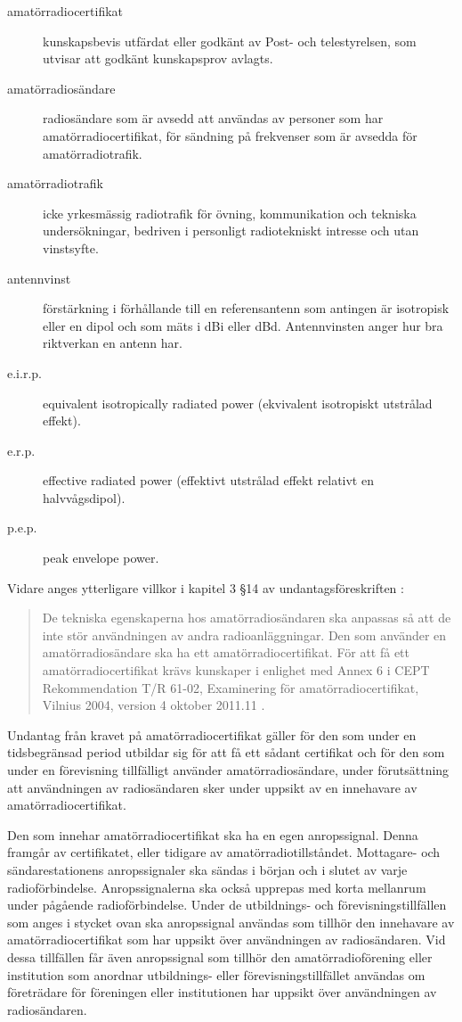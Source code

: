 \begin{description}
\item[amatörradiocertifikat] kunskapsbevis utfärdat eller godkänt av
Post- och telestyrelsen, som utvisar att godkänt kunskapsprov avlagts.

\item[amatörradiosändare] radiosändare som är avsedd att användas av personer
som har amatörradiocertifikat, för sändning på frekvenser som är avsedda för
amatörradiotrafik.

\item[amatörradiotrafik] icke yrkesmässig radiotrafik för övning,
kommunikation och tekniska undersökningar, bedriven i personligt radiotekniskt
intresse och utan vinstsyfte.

\item[antennvinst] förstärkning i förhållande till en referensantenn som
antingen är isotropisk eller en dipol och som mäts i dBi eller dBd.
Antennvinsten anger hur bra riktverkan en antenn har.

\item[e.i.r.p.] equivalent isotropically radiated power (ekvivalent
isotropiskt utstrålad effekt).

\item[e.r.p.] effective radiated power (effektivt utstrålad effekt relativt en
halvvågsdipol).

\item[p.e.p.] peak envelope power.
\end{description}
Vidare anges ytterligare villkor i kapitel 3 \S 14 av undantagsföreskriften
\cite{PTSFS2018:3}:
\begin{quote}
De tekniska egenskaperna hos amatörradiosändaren ska anpassas så att de inte
stör användningen av andra radioanläggningar.
Den som använder en amatörradiosändare ska ha ett amatörradiocertifikat.
För att få ett amatörradiocertifikat krävs kunskaper i enlighet med Annex 6 i
CEPT Rekommendation T/R 61-02, Examinering för amatörradiocertifikat,
Vilnius 2004, version 4 oktober 2011.11 \cite{TR6102}.
\end{quote}
Undantag från kravet på amatörradiocertifikat gäller för den som under en
tidsbegränsad period utbildar sig för att få ett sådant certifikat och för den
som under en förevisning tillfälligt använder amatörradiosändare, under
förutsättning att användningen av radiosändaren sker under uppsikt av en
innehavare av amatörradiocertifikat.

Den som innehar amatörradiocertifikat ska ha en egen anropssignal.
Denna framgår av certifikatet, eller tidigare av amatörradiotillståndet.
Mottagare- och sändarestationens anropssignaler ska sändas i början och i
slutet av varje radioförbindelse.
Anropssignalerna ska också upprepas med korta mellanrum under pågående
radioförbindelse. Under de utbildnings- och förevisningstillfällen som anges i
stycket ovan ska anropssignal användas som tillhör den innehavare av
amatörradiocertifikat som har uppsikt över användningen av radiosändaren.
Vid dessa tillfällen får även anropssignal som tillhör den amatörradioförening
eller institution som anordnar utbildnings- eller förevisningstillfället
användas om företrädare för föreningen eller institutionen har uppsikt över
användningen av radiosändaren.

